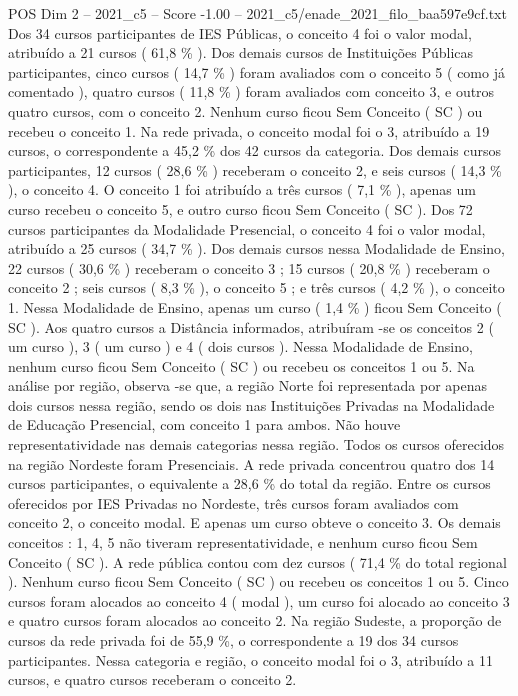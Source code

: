 \begin{textsample}{POS Dim 2 – 2021\_c5 – Score -1.00 – 2021\_c5/enade\_2021\_filo\_baa597e9cf.txt}
Dos 34 cursos participantes de IES Públicas, o conceito 4 foi o valor modal, atribuído a 21 cursos ( 61,8 \% ).
Dos demais cursos de Instituições Públicas participantes, cinco cursos ( 14,7 \% ) foram avaliados com o conceito 5 ( como já comentado ), quatro cursos ( 11,8 \% ) foram avaliados com conceito 3, e outros quatro cursos, com o conceito 2.
Nenhum curso ficou Sem Conceito ( SC ) ou recebeu o conceito 1.
Na rede privada, o conceito modal foi o 3, atribuído a 19 cursos, o correspondente a 45,2 \% dos 42 cursos da categoria.
Dos demais cursos participantes, 12 cursos ( 28,6 \% ) receberam o conceito 2, e seis cursos ( 14,3 \% ), o conceito 4.
O conceito 1 foi atribuído a três cursos ( 7,1 \% ), apenas um curso recebeu o conceito 5, e outro curso ficou Sem Conceito ( SC ).
Dos 72 cursos participantes da Modalidade Presencial, o conceito 4 foi o valor modal, atribuído a 25 cursos ( 34,7 \% ).
Dos demais cursos nessa Modalidade de Ensino, 22 cursos ( 30,6 \% ) receberam o conceito 3 ; 15 cursos ( 20,8 \% ) receberam o conceito 2 ; seis cursos ( 8,3 \% ), o conceito 5 ; e três cursos ( 4,2 \% ), o conceito 1.
Nessa Modalidade de Ensino, apenas um curso ( 1,4 \% ) ficou Sem Conceito ( SC ).
Aos quatro cursos a Distância informados, atribuíram -se os conceitos 2 ( um curso ), 3 ( um curso ) e 4 ( dois cursos ).
Nessa Modalidade de Ensino, nenhum curso ficou Sem Conceito ( SC ) ou recebeu os conceitos 1 ou 5.
Na análise por região, observa -se que, a região Norte foi representada por apenas dois cursos nessa região, sendo os dois nas Instituições Privadas na Modalidade de Educação Presencial, com conceito 1 para ambos.
Não houve representatividade nas demais categorias nessa região.
Todos os cursos oferecidos na região Nordeste foram Presenciais.
A rede privada concentrou quatro dos 14 cursos participantes, o equivalente a 28,6 \% do total da região.
Entre os cursos oferecidos por IES Privadas no Nordeste, três cursos foram avaliados com conceito 2, o conceito modal.
E apenas um curso obteve o conceito 3.
Os demais conceitos : 1, 4, 5 não tiveram representatividade, e nenhum curso ficou Sem Conceito ( SC ).
A rede pública contou com dez cursos ( 71,4 \% do total regional ).
Nenhum curso ficou Sem Conceito ( SC ) ou recebeu os conceitos 1 ou 5.
Cinco cursos foram alocados ao conceito 4 ( modal ), um curso foi alocado ao conceito 3 e quatro cursos foram alocados ao conceito 2.
Na região Sudeste, a proporção de cursos da rede privada foi de 55,9 \%, o correspondente a 19 dos 34 cursos participantes.
Nessa categoria e região, o conceito modal foi o 3, atribuído a 11 cursos, e quatro cursos receberam o conceito 2.

\end{textsample}
